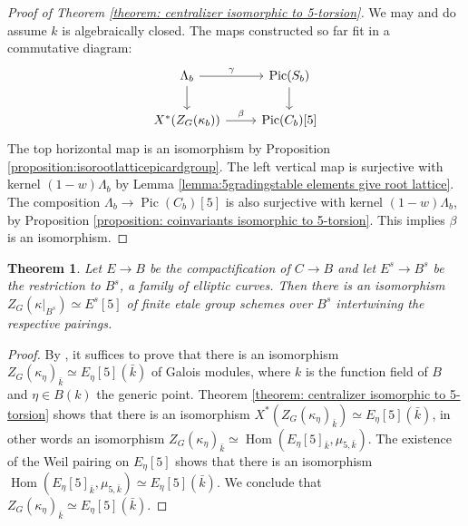 \documentclass{article} %
\newtheorem{theorem}[proposition]{Theorem}
\numberwithin{equation}{section}
\theoremstyle{definition}
\DeclareMathOperator{\Hom}{Hom}
\DeclareMathOperator{\Pic}{Pic}
\begin{document}
\begin{proof}[Proof of Theorem \ref{theorem: centralizer isomorphic to 5-torsion}]
    We may and do assume $k$ is algebraically closed.
    The maps constructed so far fit in a commutative diagram:
\[\begin{tikzcd}
	{\Lambda_b} & {\Pic(S_b)} \\
	{X^*(Z_G(\kappa_b))} & {\Pic(C_b)[5]}
	\arrow["\gamma", from=1-1, to=1-2]
	\arrow[from=1-1, to=2-1]
	\arrow[from=1-2, to=2-2]
	\arrow["\beta", from=2-1, to=2-2]
\end{tikzcd}\]
    The top horizontal map is an isomorphism by Proposition \ref{proposition:isorootlatticepicardgroup}.
    The left vertical map is surjective with kernel $(1-w)\Lambda_b$ by Lemma \ref{lemma:5gradingstable elements give root lattice}.
    The composition $\Lambda_b\rightarrow \Pic(C_b)[5]$ is also surjective with kernel $(1-w)\Lambda_b$, by Proposition \ref{proposition: coinvariants isomorphic to 5-torsion}.
    This implies $\beta$ is an isomorphism.
\end{proof}



\begin{theorem}\label{theorem: global iso centralizer 5-torsion}
    Let $E\rightarrow B$ be the compactification of $C\rightarrow B$ and let $E^s\rightarrow B^s$ be the restriction to $B^s$, a family of elliptic curves.
    Then there is an isomorphism $Z_G(\kappa|_{B^s})\simeq E^s[5]$ of finite etale group schemes over $B^s$ intertwining the respective pairings.
\end{theorem}
\begin{proof}
    By \cite[Tag \href{https://stacks.math.columbia.edu/tag/0BQM}{0BQM}]{stacksproject}, it suffices to prove that there is an isomorphism $Z_G(\kappa_{\eta})_{\bar{k}} \simeq E_{\eta}[5](\bar{k})$ of Galois modules, where $k$ is the function field of $B$ and $\eta\in B(k)$ the generic point.
    Theorem \ref{theorem: centralizer isomorphic to 5-torsion} shows that there is an isomorphism $X^*(Z_{G}(\kappa_{\eta})_{\bar{k}})\simeq E_{\eta}[5](\bar{k})$, in other words an isomorphism $Z_G(\kappa_{\eta})_{\bar{k}}\simeq \Hom(E_{\eta}[5]_{\bar{k}},\mu_{5,\bar{k}})$.
    The existence of the Weil pairing on $E_{\eta}[5]$ shows that there is an isomorphism $\Hom(E_{\eta}[5]_{\bar{k}},\mu_{5,\bar{k}}) \simeq E_{\eta}[5](\bar{k})$.
    We conclude that $Z_G(\kappa_{\eta})_{\bar{k}} \simeq E_{\eta}[5](\bar{k})$.
\end{proof}
\end{document}
